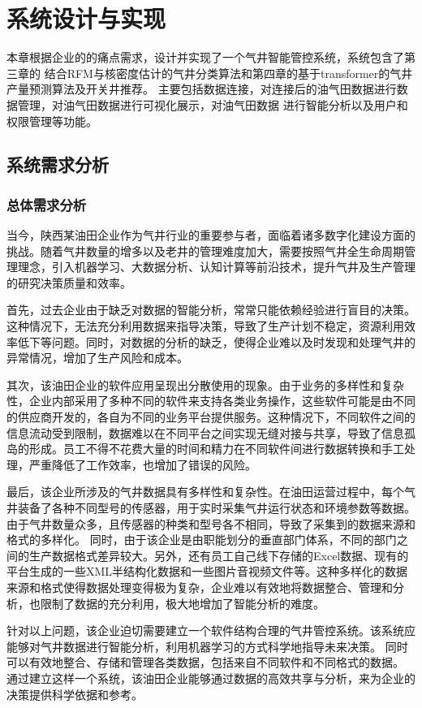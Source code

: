 \chapter{系统设计与实现}
本章根据企业的的痛点需求，设计并实现了一个气井智能管控系统，系统包含了第三章的
结合RFM与核密度估计的气井分类算法和第四章的基于transformer的气井产量预测算法及开关井推荐。
主要包括数据连接，对连接后的油气田数据进行数据管理，对油气田数据进行可视化展示，对油气田数据
进行智能分析以及用户和权限管理等功能。
\section{系统需求分析}
\subsection{总体需求分析}
当今，陕西某油田企业作为气井行业的重要参与者，面临着诸多数字化建设方面的挑战。随着气井数量的增多以及老井的管理难度加大，需要按照气井全生命周期管理理念，引入机器学习、大数据分析、认知计算等前沿技术，提升气井及生产管理的研究决策质量和效率。

首先，过去企业由于缺乏对数据的智能分析，常常只能依赖经验进行盲目的决策。这种情况下，无法充分利用数据来指导决策，导致了生产计划不稳定，资源利用效率低下等问题。同时，对数据的分析的缺乏，使得企业难以及时发现和处理气井的异常情况，增加了生产风险和成本。

其次，该油田企业的软件应用呈现出分散使用的现象。由于业务的多样性和复杂性，企业内部采用了多种不同的软件来支持各类业务操作，这些软件可能是由不同的供应商开发的，各自为不同的业务平台提供服务。这种情况下，不同软件之间的信息流动受到限制，数据难以在不同平台之间实现无缝对接与共享，导致了信息孤岛的形成。员工不得不花费大量的时间和精力在不同软件间进行数据转换和手工处理，严重降低了工作效率，也增加了错误的风险。

最后，该企业所涉及的气井数据具有多样性和复杂性。在油田运营过程中，每个气井装备了各种不同型号的传感器，用于实时采集气井运行状态和环境参数等数据。由于气井数量众多，且传感器的种类和型号各不相同，导致了采集到的数据来源和格式的多样化。
同时，由于该企业是由职能划分的垂直部门体系，不同的部门之间的生产数据格式差异较大。另外，还有员工自己线下存储的Excel数据、现有的平台生成的一些XML半结构化数据和一些图片音视频文件等。这种多样化的数据来源和格式使得数据处理变得极为复杂，企业难以有效地将数据整合、管理和分析，也限制了数据的充分利用，极大地增加了智能分析的难度。

针对以上问题，该企业迫切需要建立一个软件结构合理的气井管控系统。该系统应能够对气井数据进行智能分析，利用机器学习的方式科学地指导未来决策。
同时可以有效地整合、存储和管理各类数据，包括来自不同软件和不同格式的数据。
通过建立这样一个系统，该油田企业能够通过数据的高效共享与分析，来为企业的决策提供科学依据和参考。

